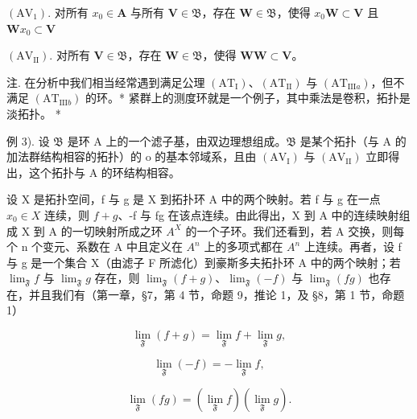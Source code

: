 \((\mathrm{AV}_{1})\). 对所有 \(x_0\in \mathbf{A}\) 与所有 \(\mathbf{V}\in \mathfrak{B}\)，存在 \(\mathbf{W}\in \mathfrak{B}\)，使得 \(x_0\mathbf{W}\subset \mathbf{V}\) 且 \(\mathbf{W}x_0\subset \mathbf{V}\)

\((\mathrm{AV}_{\mathrm{II}})\). 对所有 \(\mathbf{V} \in \mathfrak{B}\)，存在 \(\mathbf{W} \in \mathfrak{B}\)，使得 \(\mathbf{WW} \subset \mathbf{V}\)。

注. 在分析中我们相当经常遇到满足公理 \((\mathrm{AT}_{\mathrm{I}})\)、\((\mathrm{AT}_{\mathrm{II}})\) 与 \((\mathrm{AT}_{\mathrm{III}a})\)，但不满足 \((\mathrm{AT}_{\mathrm{III}b})\) 的环。* 紧群上的测度环就是一个例子，其中乘法是卷积，拓扑是淡拓扑。 *

例 3). 设 \(\mathfrak{B}\) 是环 A 上的一个滤子基，由双边理想组成。\(\mathfrak{B}\) 是某个拓扑（与 A 的加法群结构相容的拓扑）的 o 的基本邻域系，且由 \((\mathrm{AV}_{\mathrm{I}})\) 与 \((\mathrm{AV}_{\mathrm{II}})\) 立即得出，这个拓扑与 A 的环结构相容。

设 X 是拓扑空间，f 与 g 是 X 到拓扑环 A 中的两个映射。若 f 与 g 在一点 \(x_{0} \in X\) 连续，则 \(f + g\)、-f 与 fg 在该点连续。由此得出，X 到 A 中的连续映射组成 X 到 A 的一切映射所成之环 \(A^{X}\) 的一个子环。我们还看到，若 A 交换，则每个 n 个变元、系数在 A 中且定义在 \(A^{n}\) 上的多项式都在 \(A^{n}\) 上连续。再者，设 f 与 g 是一个集合 X（由滤子 F 所滤化）到豪斯多夫拓扑环 A 中的两个映射；若 \(\lim_{\mathfrak{F}} f\) 与 \(\lim_{\mathfrak{F}} g\) 存在，则 \(\lim_{\mathfrak{F}} (f + g)\)、\(\lim_{\mathfrak{F}} (-f)\) 与 \(\lim_{\mathfrak{F}} (fg)\) 也存在，并且我们有（第一章，§7，第 4 节，命题 9，推论 1，及 §8，第 1 节，命题 1）

\[
\lim _ {\mathfrak {F}} (f + g) = \lim _ {\mathfrak {F}} f + \lim _ {\mathfrak {F}} g,\tag{1}
\]

\[
\lim _ {\mathfrak {F}} (- f) = - \lim _ {\mathfrak {F}} f,\tag{2}
\]

\[
\lim _ {\mathfrak {F}} (f g) = (\lim _ {\mathfrak {F}} f) (\lim _ {\mathfrak {F}} g).\tag{3}
\]

